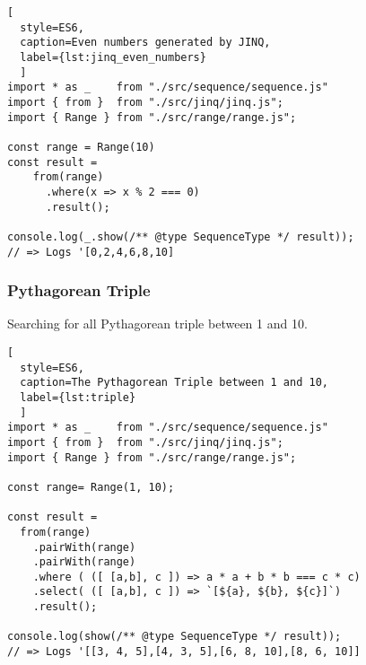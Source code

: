 \begin{lstlisting}[
  style=ES6, 
  caption=Even numbers generated by JINQ,
  label={lst:jinq_even_numbers}
  ]
import * as _    from "./src/sequence/sequence.js"
import { from }  from "./src/jinq/jinq.js";
import { Range } from "./src/range/range.js";

const range = Range(10)
const result =
    from(range)
      .where(x => x % 2 === 0)
      .result();

console.log(_.show(/** @type SequenceType */ result));
// => Logs '[0,2,4,6,8,10]
\end{lstlisting}


\subsubsection{Pythagorean Triple}
\label{subsub:JINQ_Pythagorean Triple}
Searching for all Pythagorean triple between 1 and 10.

\begin{lstlisting}[
  style=ES6, 
  caption=The Pythagorean Triple between 1 and 10,
  label={lst:triple}
  ]
import * as _    from "./src/sequence/sequence.js"
import { from }  from "./src/jinq/jinq.js";
import { Range } from "./src/range/range.js";

const range= Range(1, 10);

const result =
  from(range)
    .pairWith(range)
    .pairWith(range)
    .where ( ([ [a,b], c ]) => a * a + b * b === c * c)
    .select( ([ [a,b], c ]) => `[${a}, ${b}, ${c}]`)
    .result();

console.log(show(/** @type SequenceType */ result));
// => Logs '[[3, 4, 5],[4, 3, 5],[6, 8, 10],[8, 6, 10]]
\end{lstlisting}

